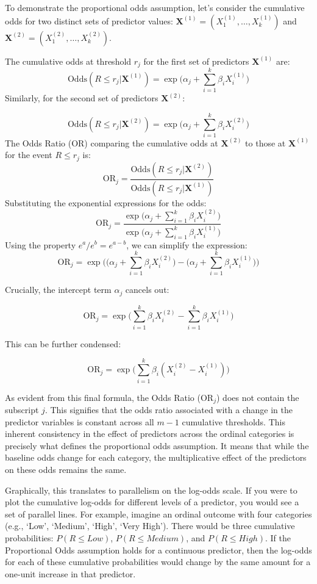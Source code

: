 \documentclass[
  letterpaper,
  DIV=11,
  numbers=noendperiod]{scrartcl}
\begin{document}
To demonstrate the proportional odds assumption, let's consider the
cumulative odds for two distinct sets of predictor values:
\(\boldsymbol{X}^{(1)} = (X_1^{(1)}, \dots, X_k^{(1)})\) and
\(\boldsymbol{X}^{(2)} = (X_1^{(2)}, \dots, X_k^{(2)})\).

The cumulative odds at threshold \(r_j\) for the first set of predictors
\(\boldsymbol{X}^{(1)}\) are: \[
\text{Odds}(R \leq r_j | \boldsymbol{X}^{(1)}) =\exp \Bigg( \alpha_j + \sum_{i=1}^{k} \beta_iX_i^{(1)} \Bigg)
\] Similarly, for the second set of predictors \(\boldsymbol{X}^{(2)}\):

\[
\text{Odds}(R \leq r_j | \boldsymbol{X}^{(2)}) = \exp \Bigg( \alpha_j + \sum_{i=1}^{k} \beta_iX_i^{(2)} \Bigg)
\] The Odds Ratio (OR) comparing the cumulative odds at
\(\boldsymbol{X}^{(2)}\) to those at \(\boldsymbol{X}^{(1)}\) for the
event \(R \leq r_j\) is: \[
\text{OR}_j = \frac{\text{Odds}(R \leq r_j | \boldsymbol{X}^{(2)})}{\text{Odds}(R \leq r_j | \boldsymbol{X}^{(1)})}
\] Substituting the exponential expressions for the odds: \[
\text{OR}_j = \frac{\exp \Big( \alpha_j + \sum_{i=1}^{k} \beta_iX_i^{(2)} \Big)}{\exp \Big( \alpha_j + \sum_{i=1}^{k} \beta_iX_i^{(1)} \Big)}
\] Using the property \(e^a / e^b = e^{a-b}\), we can simplify the
expression: \[
\text{OR}_j = \exp \Bigg( \Big( \alpha_j + \sum_{i=1}^{k} \beta_iX_i^{(2)} \Big) - \Big( \alpha_j + \sum_{i=1}^{k} \beta_iX_i^{(1)} \Big) \Bigg)
\]

Crucially, the intercept term \(\alpha_j\) cancels out:

\[
\text{OR}_j = \exp \Bigg( \sum_{i=1}^{k} \beta_iX_i^{(2)} - \sum_{i=1}^{k} \beta_iX_i^{(1)} \Bigg)
\]

This can be further condensed:

\[
\text{OR}_j = \exp \Bigg( \sum_{i=1}^{k} \beta_i(X_i^{(2)} - X_i^{(1)}) \Bigg)
\]

As evident from this final formula, the Odds Ratio (\(\text{OR}_j\))
does not contain the subscript \(j\). This signifies that the odds ratio
associated with a change in the predictor variables is constant across
all \(m-1\) cumulative thresholds. This inherent consistency in the
effect of predictors across the ordinal categories is precisely what
defines the proportional odds assumption. It means that while the
baseline odds change for each category, the multiplicative effect of the
predictors on these odds remains the same.

Graphically, this translates to parallelism on the log-odds scale. If
you were to plot the cumulative log-odds for different levels of a
predictor, you would see a set of parallel lines. For example, imagine
an ordinal outcome with four categories (e.g., `Low', `Medium', `High',
`Very High'). There would be three cumulative probabilities:
\(P(R\leq Low)\), \(P(R \leq Medium)\), and \(P(R \leq High)\). If the
Proportional Odds assumption holds for a continuous predictor, then the
log-odds for each of these cumulative probabilities would change by the
same amount for a one-unit increase in that predictor.
\end{document}
